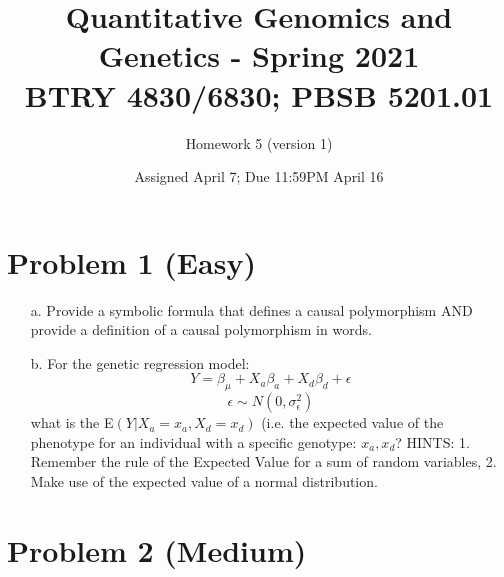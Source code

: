\documentclass[letterpaper, 11pt]{article}
\title{Quantitative Genomics and Genetics - Spring 2021 \\
BTRY 4830/6830; PBSB 5201.01}
\author{Homework 5 (version 1)}
\date{Assigned April 7;  Due 11:59PM April 16}                                           %
\begin{document}
\vspace{-20in}

\maketitle
\section*{Problem 1 (Easy)}

\begin{itemize}

\item[a.] Provide a symbolic formula that defines a causal polymorphism AND provide a definition of a causal polymorphism in words.

\item[b.] For the genetic regression model:
\begin{equation}
 Y = \beta_{\mu} + X_a \beta_a + X_d \beta_d + \epsilon
\end{equation}
\begin{equation}
 \epsilon \sim N(0, \sigma^2_\epsilon)
\end{equation}
what is the E$(Y | X_a = x_a, X_d = x_d)$ (i.e. the expected value of the phenotype for an individual with a specific genotype: $x_a, x_d$?  HINTS: 1. Remember the rule of the Expected Value for a sum of random variables, 2. Make use of the expected value of a normal distribution.

\end{itemize}

\section*{Problem 2 (Medium)}
\end{document}
